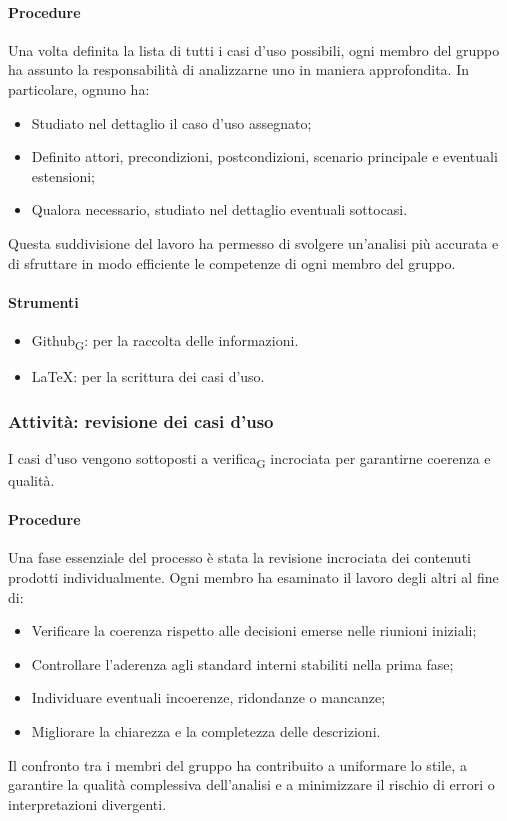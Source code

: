 \documentclass[11pt,a4paper]{article}
\newcommand{\gls}[1]{#1\textsubscript{G}}
\begin{document}
\paragraph{Procedure}
Una volta definita la lista di tutti i casi d’uso possibili, ogni membro del gruppo ha assunto la responsabilità di analizzarne uno in maniera approfondita. In particolare, ognuno ha:
\begin{itemize}
\item Studiato nel dettaglio il caso d’uso assegnato;
\item Definito attori, precondizioni, postcondizioni, scenario principale e eventuali estensioni;
\item Qualora necessario, studiato nel dettaglio eventuali sottocasi.
\end{itemize}
Questa suddivisione del lavoro ha permesso di svolgere un’analisi più accurata e di sfruttare in modo efficiente le competenze di ogni membro del gruppo.

\paragraph{Strumenti}
\begin{itemize}
\item \gls{Github}: per la raccolta delle informazioni.
\item LaTeX: per la scrittura dei casi d'uso.
\end{itemize}

\subsubsection{Attività: revisione dei casi d'uso}
I casi d’uso vengono sottoposti a \gls{verifica} incrociata per garantirne coerenza e qualità.

\paragraph{Procedure}
Una fase essenziale del processo è stata la revisione incrociata dei contenuti prodotti individualmente.
Ogni membro ha esaminato il lavoro degli altri al fine di:
\begin{itemize}
\item Verificare la coerenza rispetto alle decisioni emerse nelle riunioni iniziali;
\item Controllare l’aderenza agli standard interni stabiliti nella prima fase;
\item Individuare eventuali incoerenze, ridondanze o mancanze;
\item Migliorare la chiarezza e la completezza delle descrizioni.
\end{itemize}
Il confronto tra i membri del gruppo ha contribuito a uniformare lo stile, a garantire la qualità complessiva dell’analisi e a minimizzare il rischio di errori o interpretazioni divergenti.
\end{document}
